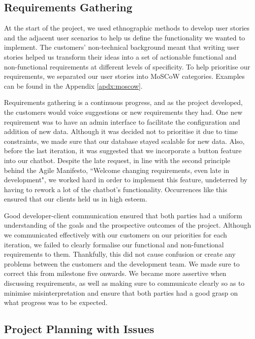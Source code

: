 \documentclass{l3proj}
\begin{document}
\subsection{Requirements Gathering}
\label{subsec:get_reqs}

At the start of the project, we used ethnographic methods to develop user stories and the adjacent user scenarios to help us define the functionality we wanted to implement. The customers' non-technical background meant that writing user stories  helped us transform their ideas into a set of actionable functional and non-functional requirements at different levels of specificity\cite{userstories:mgs}. To help prioritise our requirements, we separated our user stories into MoSCoW categories. Examples can be found in the Appendix \ref{apdx:moscow}.

Requirements gathering is a continuous progress, and as the project developed, the customers would voice suggestions or new requirements they had. One new requirement was to have an admin interface to facilitate the configuration and addition of new data. Although it was decided not to prioritise it due to time constraints, we made sure that our database stayed scalable for new data. Also, before the last iteration, it was suggested that we incorporate a button feature into our chatbot. Despite the late request, in line with the second principle behind the Agile Manifesto, ``Welcome changing requirements, even late in development"\cite{agilemanifesto}, we worked hard in order to implement this feature, undeterred by having to rework a lot of the chatbot's functionality. Occurrences like this ensured that our clients held us in high esteem.

Good developer-client communication ensured that both parties had a uniform understanding of the goals and the prospective outcomes of the project. Although we communicated effectively with our customers on our priorities for each iteration, we failed to clearly formalise our functional and non-functional requirements to them. Thankfully, this did not cause confusion or create any problems between the customers and the development team. We made sure to correct this from milestone five onwards. We became more assertive when discussing requirements, as well as making sure to communicate clearly so as to minimise misinterpretation and ensure that both parties had a good grasp on what progress was to be expected.

\subsection{Project Planning with Issues}
\end{document}
